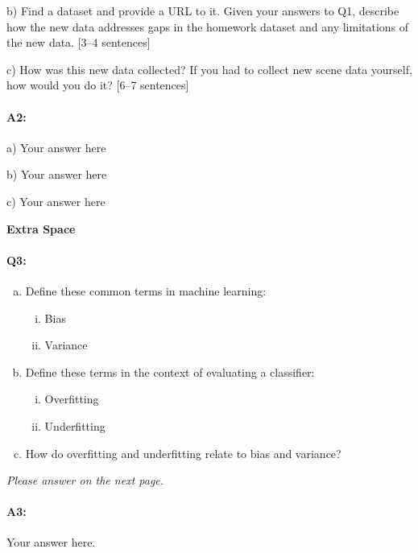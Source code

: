 b) Find a dataset and provide a URL to it. Given your answers to Q1, describe how the new data addresses gaps in the homework dataset and any limitations of the new data. [3--4 sentences] 

c) How was this new data collected? If you had to collect new scene data yourself, how would you do it? [6--7 sentences]

\paragraph{A2:} 

a) Your answer here

b) Your answer here

c) Your answer here

 

\pagebreak

\textbf{Extra Space}

\pagebreak

\paragraph{Q3:} 

\begin{enumerate} [(a)]
    \item Define these common terms in machine learning:
    \begin{enumerate} [(i)]
    \item Bias
    \item Variance
    \end{enumerate}
    \item Define these terms in the context of evaluating a classifier:
    \begin{enumerate} [(i)]
    \item Overfitting
    \item Underfitting
    \end{enumerate}
    \item How do overfitting and underfitting relate to bias and variance?
\end{enumerate}

\emph{Please answer on the next page.}

\pagebreak
\paragraph{A3:} Your answer here.

